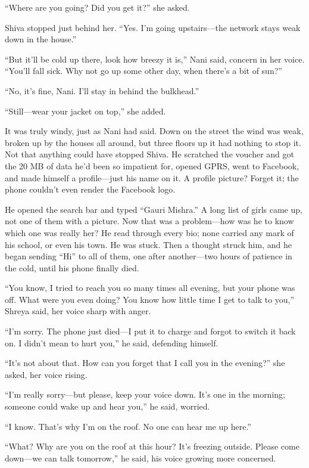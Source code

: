 ``Where are you going? Did you get it?'' she asked.

Shiva stopped just behind her. ``Yes. I'm going upstairs—the network stays weak down in the house.''

``But it'll be cold up there, look how breezy it is,'' Nani said, concern in her voice. ``You'll fall sick. Why not go up some other day, when there's a bit of sun?''

``No, it's fine, Nani. I'll stay in behind the bulkhead.''

``Still—wear your jacket on top,'' she added.

It was truly windy, just as Nani had said. Down on the street the wind was weak, broken up by the houses all around, but three floors up it had nothing to stop it. Not that anything could have stopped Shiva. He scratched the voucher and got the 20 MB of data he'd been so impatient for, opened GPRS, went to Facebook, and made himself a profile—just his name on it. A profile picture? Forget it; the phone couldn't even render the Facebook logo.

He opened the search bar and typed ``Gauri Mishra.'' A long list of girls came up, not one of them with a picture. Now that was a problem—how was he to know which one was really her? He read through every bio; none carried any mark of his school, or even his town. He was stuck. Then a thought struck him, and he began sending ``Hi'' to all of them, one after another—two hours of patience in the cold, until his phone finally died.

``You know, I tried to reach you so many times all evening, but your phone was off. What were you even doing? You know how little time I get to talk to you,'' Shreya said, her voice sharp with anger.

``I'm sorry. The phone just died—I put it to charge and forgot to switch it back on. I didn't mean to hurt you,'' he said, defending himself.

``It's not about that. How can you forget that I call you in the evening?'' she asked, her voice rising.

``I'm really sorry—but please, keep your voice down. It's one in the morning; someone could wake up and hear you,'' he said, worried.

``I know. That's why I'm on the roof. No one can hear me up here.''

``What? Why are you on the roof at this hour? It's freezing outside. Please come down—we can talk tomorrow,'' he said, his voice growing more concerned.

